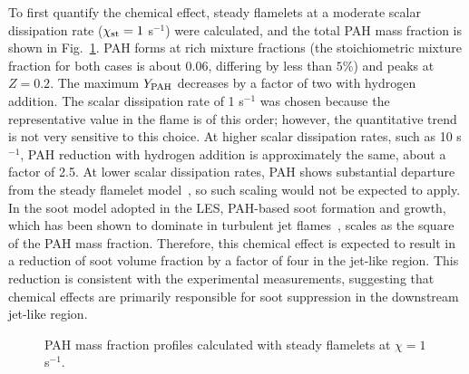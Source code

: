 \documentclass[review,3p,times]{elsarticle}
\begin{document}
To first quantify the chemical effect, steady flamelets at a moderate scalar dissipation rate ($\chi_{\rm st} = 1$ s$^{-1}$) were calculated, and the total PAH mass fraction is shown in Fig.~\ref{fig:flamelet}.  PAH forms at rich mixture fractions (the stoichiometric mixture fraction for both cases is about $0.06$, differing by less than $5$\%) and peaks at $Z = 0.2$.  The maximum $Y_{\rm PAH}$ decreases by a factor of two with hydrogen addition.  \textcolor{Rv1}{The scalar dissipation rate of 1 s$^{-1}$ was chosen because the representative value in the flame is of this order; however, the quantitative trend is not very sensitive to this choice.  At higher scalar dissipation rates, such as 10 s$^{-1}$, PAH reduction with hydrogen addition is approximately the same, about a factor of 2.5.  At lower scalar dissipation rates, PAH shows substantial departure from the steady flamelet model~\cite{bisetti12}, so such scaling would not be expected to apply.  }In the soot model adopted in the LES, PAH-based soot formation and growth, which has been shown to dominate in turbulent jet flames~\cite{bisetti12,attili14,attili15,mueller12,mueller13}, scales as the square of the PAH mass fraction.  Therefore, this chemical effect is expected to result in a reduction of soot volume fraction by a factor of four in the jet-like region.  This reduction is consistent with the experimental measurements, \textcolor{Rv1}{suggesting that chemical effects are primarily responsible for soot suppression in the downstream jet-like region.}

\begin{figure}[t]
  \centering
  \scriptsize
  \resizebox{0.5\textwidth}{!}{}
  \normalsize
  \vspace{-0.3in}
  \caption{PAH mass fraction profiles calculated with steady flamelets at $\chi = 1$ s$^{-1}$.}
  \label{fig:flamelet}
\end{figure}
\end{document}
